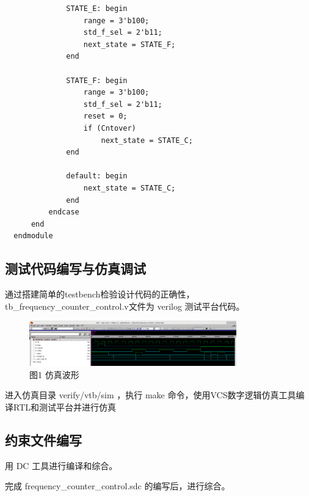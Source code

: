 \begin{verbatim}
              STATE_E: begin
                  range = 3'b100;
                  std_f_sel = 2'b11;
                  next_state = STATE_F;
              end
  
              STATE_F: begin
                  range = 3'b100;
                  std_f_sel = 2'b11;
                  reset = 0;
                  if (Cntover)
                      next_state = STATE_C;
              end
  
              default: begin
                  next_state = STATE_C;
              end
          endcase
      end
  endmodule
\end{verbatim}  

\subsection{测试代码编写与仿真调试}

通过搭建简单的testbench检验设计代码的正确性，tb\_frequency\_counter\_control.v文件为 verilog 测试平台代码。


\begin{figure}[H]
    \centering
    \includegraphics[width=0.8\textwidth]{images/final-task03-01.png}
    \caption{图1 仿真波形}
\end{figure}

进入仿真目录 verify/vtb/sim ，执行 make 命令，使用VCS数字逻辑仿真工具编译RTL和测试平台并进行仿真

\subsection{约束文件编写}

用 DC 工具进行编译和综合。

完成 frequency\_counter\_control.sdc 的编写后，进行综合。


